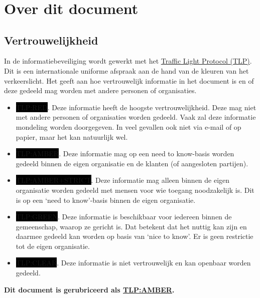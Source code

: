 \documentclass[11pt, a4paper]{report}
\title{ \reporttitle{} }
\author{ \application{} }
\newcommand\tlp{AMBER}
\begin{document}
\maketitle

\chapter{Over dit document}
\section{Vertrouwelijkheid}
In de informatiebeveiliging wordt gewerkt met het
\href{https://www.ncsc.nl/onderwerpen/traffic-light-protocol}{Traffic
Light Protocol (TLP)}. Dit is een internationale uniforme afspraak aan
de hand van de kleuren van het verkeerslicht. Het geeft aan hoe
vertrouwelijk informatie in het document is en of deze gedeeld mag
worden met andere personen of organisaties.

\begin{itemize}
     \item \colorbox{black}{\color{red}TLP:RED}. Deze informatie heeft
de hoogste vertrouwelijkheid. Deze mag niet met andere personen of
organisaties worden gedeeld. Vaak zal deze informatie mondeling worden
doorgegeven. In veel gevallen ook niet via e-mail of op papier, maar het
kan natuurlijk wel.
     \item \colorbox{black}{\color{orange}TLP:AMBER}. Deze informatie
mag op een need to know-basis worden gedeeld binnen de eigen organisatie
en de klanten (of aangesloten partijen).
     \item \colorbox{black}{\color{orange}TLP:AMBER+STRICT}. Deze
informatie mag alleen binnen de eigen organisatie worden gedeeld met
mensen voor wie toegang noodzakelijk is. Dit is op een `need to
know'-basis binnen de eigen organisatie.
     \item \colorbox{black}{\color{green}TLP:GREEN}. Deze informatie is
beschikbaar voor iedereen binnen de gemeenschap, waarop ze gericht is.
Dat betekent dat het nuttig kan zijn en daarmee gedeeld kan worden op
basis van `nice to know'. Er is geen restrictie tot de eigen organisatie.
     \item \colorbox{black}{\color{white}TLP:CLEAR}. Deze informatie is
niet vertrouwelijk en kan openbaar worden gedeeld.
\end{itemize}

\textbf{Dit document is gerubriceerd als \underline{TLP:\tlp}.}


\tableofcontents
\end{document}
